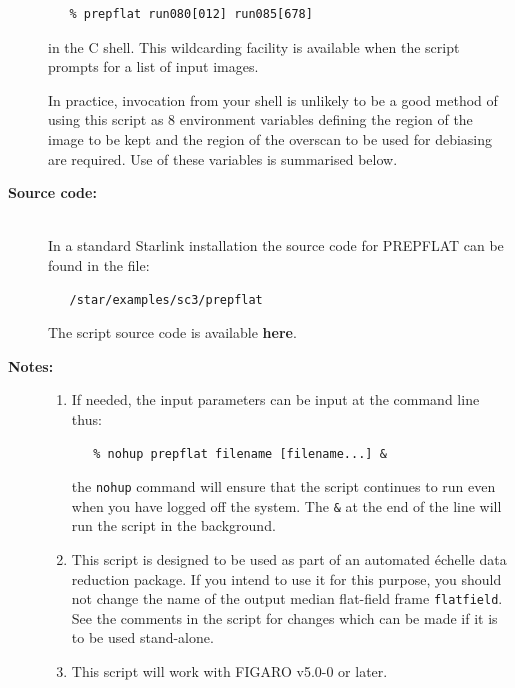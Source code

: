 \documentclass[twoside,11pt]{article}
\newenvironment{latexonly}{}{}
\newcommand{\htmlref}[2]{#1}
\newcommand{\xref}[3]{#1}
\begin{document}
\begin{description}
\begin{verbatim}
   % prepflat run080[012] run085[678]
\end{verbatim}

     in the C shell.  This wildcarding facility is available when the
     script prompts for a list of input images.

     In practice, invocation from your shell is unlikely to be a good
     method of using this script as 8 environment variables defining
     the region of the image to be kept and the region of the overscan
     to be used for debiasing are required.  Use of these variables is
     summarised below.

\item [{\bf Source code:}] \mbox{} \\
\begin{latexonly}
In a standard Starlink installation the source code for PREPFLAT can be found
in the file:
\begin{verbatim}
   /star/examples/sc3/prepflat
\end{verbatim}
\end{latexonly}
\begin{htmlonly}
      The script source code is available
      \htmlref{{\bf here}}{se_prepflat_source}.
\end{htmlonly}

\item [{\bf Notes:}] \mbox{}
\begin{enumerate}
\item If needed, the input parameters can be input at the command
      line thus:

\begin{verbatim}
   % nohup prepflat filename [filename...] &
\end{verbatim}

      the \verb+nohup+ command will ensure that the script continues
      to run even when you have logged off the system.  The \verb+&+ at
      the end of the line will run the script in the background.

\item This script is designed to be used as part of an automated
      \'{e}chelle data reduction package.  If you intend to use it
      for this purpose, you should not change the name of the output
      median flat-field frame \verb+flatfield+.  See the comments in the
      script for changes which can be made if it is to be used
      stand-alone.

\item This script will work with \xref{FIGARO}{sun86}{} v5.0-0 or later.


\end{enumerate}
\end{description}
\end{document}
